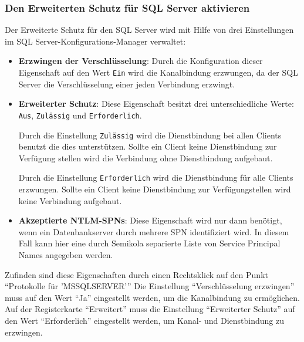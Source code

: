         \subsubsection{Den Erweiterten Schutz für SQL Server aktivieren}
          Der Erweiterte Schutz für den SQL Server wird mit Hilfe von drei
          Einstellungen im SQL Server-Konfigurations-Manager verwaltet:
          \begin{itemize}
            \item \textbf{Erzwingen der Verschlüsselung}: Durch die
            Konfiguration dieser Eigenschaft auf den Wert \texttt{Ein} wird die
            Kanalbindung erzwungen, da der SQL Server die Verschlüsselung einer
            jeden Verbindung erzwingt.
            \item \textbf{Erweiterter Schutz}: Diese Eigenschaft besitzt drei
            unterschiedliche Werte: \texttt{Aus}, \texttt{Zulässig} und
            \texttt{Erforderlich}.
            
            Durch die Einstellung \texttt{Zulässig} wird die Dienstbindung bei
            allen Clients benutzt die dies unterstützen. Sollte ein Client keine
            Dienstbindung zur Verfügung stellen wird die Verbindung ohne
            Dienstbindung aufgebaut.
            
            Durch die Einstellung \texttt{Erforderlich} wird die Dienstbindung
            für alle Clients erzwungen. Sollte ein Client keine Dienstbindung
            zur Verfügungstellen wird keine Verbindung aufgebaut.
            \item \textbf{Akzeptierte NTLM-SPNs}: Diese Eigenschaft wird nur
            dann benötigt, wenn ein Datenbankserver durch mehrere SPN
            identifiziert wird. In diesem Fall kann hier eine durch Semikola
            separierte Liste von Service Principal Names angegeben werden.
          \end{itemize}
          Zufinden sind diese Eigenschaften durch einen Rechtsklick auf den
          Punkt \enquote{Protokolle für 'MSSQLSERVER'}
          Die Einstellung \enquote{Verschlüsselung erzwingen} muss auf den Wert
          \enquote{Ja} eingestellt werden, um die Kanalbindung zu ermöglichen.
          Auf der Registerkarte \enquote{Erweitert} muss die Einstellung
          \enquote{Erweiterter Schutz} auf den Wert \enquote{Erforderlich}
          eingestellt werden, um Kanal- und Dienstbindung zu erzwingen.
          \begin{literaturinternet}
            \item \cite{ff487261}
          \end{literaturinternet}
    
    
